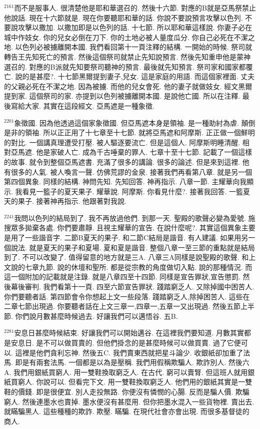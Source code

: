 \documentclass{book}
\begin{document}
$^{2161}$而不是服事人.
很清楚他是耶和華選召的.
然後十六節.
對應的B就是亞馬祭禁止他說話.
現在十六節就是.
現在你要聽耶和華的話.
你說不要說預言攻擊以色列.
不要說攻擊以撒加.
以撒加即是以色列的話.
十七節.
所以耶和華這樣說.
你妻子必在城中作妓女.
你的兒女必倒在刀下.
你的土地必被人量度瓜分.
你自己必死在不潔之地.
以色列必被擄離開本國.
我們看回第十一頁注釋的結構.
一開始的時候.
祭司就轉告王先知死亡的預言.
然後這個祭司就禁止先知說預言.
然後先知重申他是蒙神選召的.
對應的B派就先知要祭司聽神的預言.
最後就先知預言.
祭司家和國家都覆亡.
說的是甚麼?.
十七節黑爾提到妻子,兒女.
這是家庭的用語.
而這個家裡面.
丈夫的父親必死在不潔之地.
因為被擄.
而他的兒女會死.
他的妻子就做妓女.
經文黑爾提到家.
這個祭司的家.
亦提到以色列被擄離開本國.
是說他亡國.
所以在注釋.
最後寫給大家.
其實在這段經文.
亞馬遮是一種象徵.

$^{2201}$象徵國.
因為他透過這個家象徵國.
但亞馬遮本身是領袖.
是一種助紂為虐.
顛倒是非的領袖.
所以正正用了十七章至十七節.
就將亞馬遮和阿摩斯.
正正做一個鮮明的對比.
一個講真理遭受打壓.
被人驅逐要流亡.
但是這個人.
阿摩斯明睡清醒.
相對亞馬遮.
他是家破人亡.
成為千古唾棄的罪人.
七章十至十七節.
記載了一個這樣的故事.
就令到整個亞馬遮書.
充滿了很多的講論.
很多的論述.
但是來到這裡.
他有很多的人氣.
被人喚言一聲.
仿佛荒謬的金泉.
接著我們再看第八章.
就是另一個第四個異象.
同樣的結構.
神問先知.
先知回答.
神再指示.
八章一節.
主耀華向我顯示.
我看見一籃子的夏天果子.
耀華說.
阿摩斯.
你看見什麼?.
接著我回答.
一籃夏天的果子.
接著神再指示.
他跟著對我說.

$^{2241}$我問以色列的結局到了.
我不再放過他們.
到那一天.
聖殿的歌聲必變為愛號.
施搜眾多拋棄各處.
你們要肅靜.
且視主耀華的宣告.
在說什麼呢?.
其實這個異象主要是用了一些諧音字.
二節B夏天的果子.
和二節C結局是諧音.
有人建議.
如果用另一個說法.
就是夏天的果子和夏場.
夏和夏是諧音.
整個八章一至三節的重點就是結局到了.
不可以改變了.
值得留意的地方就是三A.
八章三A同樣是說聖殿的歌聲.
和上文說的七章九節.
說的休壇和聖所.
都是從宗教的角度做切入點.
說的那種情況.
而這一個附加的記載就是注錄.
就是八章四至十四節.
同樣是宣告罪狀,宣告懲罰.
然後幕後審判.
我們看第十一頁.
四至六節宣告罪狀.
踐踏窮乏人.
又除掉國中困苦人.
你們要聽者話.
第四節會令你想起上文一些段落.
踐踏窮乏人,除掉困苦人.
這些在二章七節出現過.
你要聽者話在上文三章一,四章一,五章一又出現過.
然後五節上半節.
你們說月數甚麼時候過去.
好讓我們可以邁悟谷.
五B.

$^{2281}$安息日甚麼時候結束.
好讓我們可以開始邁谷.
在這裡我們要知道.
月數其實都是安息日.
是不可以做買賣的.
但他們掛念的是甚麼時候可以做買賣.
過了它便可以.
這裡是他們貪利忘神.
然後五C.
我們賣東西就把星斗論少.
收銀紙卻加重了法馬.
即是有兩套法馬.
一個都是以為是壓稱.
我們用假稱欺騙人.
欺詐別人.
然後六A.
我們用銀紙買窮人.
用一雙鞋換取窮乏人.
在古代.
窮可以賣腎.
但這班人就用銀紙買窮人.
你說可以.
但看完下文.
用一雙鞋換取窮乏人.
他們用的銀紙其實是一雙鞋的價錢.
即是很便宜.
別人走投無路.
你便沒有憐憫的心腸.
反而是騙人價.
欺騙窮人.
然後連墨水也賣掉.
墨水便沒有甚麼用.
但你把墨水混入一些貨物裡.
賣出去.
就瞞騙黑人.
這些種種的欺詐.
欺壓.
瞞騙.
在現代社會亦會出現.
而很多基督徒的商人.
\end{document}

